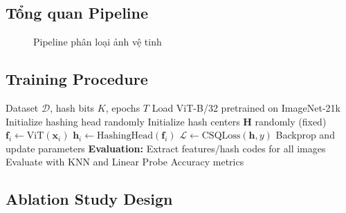 \documentclass[12pt,a4paper]{article}
\begin{document}
\subsection{Tổng quan Pipeline}

\begin{figure}[H]
\centering
{}
\caption{Pipeline phân loại ảnh vệ tinh}
\end{figure}

\subsection{Training Procedure}

\begin{algorithm}[H]
\caption{Training ViT + Hashing cho Classification}
\begin{algorithmic}[1]
\REQUIRE Dataset $\mathcal{D}$, hash bits $K$, epochs $T$
\STATE Load ViT-B/32 pretrained on ImageNet-21k
\STATE Initialize hashing head randomly
\STATE Initialize hash centers $\mathbf{H}$ randomly (fixed)
        \STATE $\mathbf{f}_i \leftarrow \text{ViT}(\mathbf{x}_i)$
        \STATE $\mathbf{h}_i \leftarrow \text{HashingHead}(\mathbf{f}_i)$
        \STATE $\mathcal{L} \leftarrow \text{CSQLoss}(\mathbf{h}, y)$
        \STATE Backprop and update parameters
    \ENDFOR
\ENDFOR
\STATE \textbf{Evaluation:}
\STATE Extract features/hash codes for all images
\STATE Evaluate with KNN and Linear Probe
\RETURN Accuracy metrics
\end{algorithmic}
\end{algorithm}

\subsection{Ablation Study Design}
\end{document}
